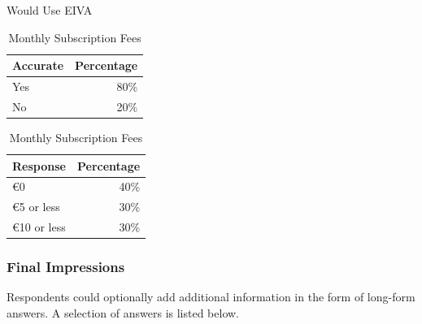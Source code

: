 \documentclass{article}
\begin{document}
\begin{table}[!htb]
	\begin{minipage}{.5\linewidth}
		\caption{Would Use EIVA}
		\centering
		\begin{tabular}{lr}
			\hline
			\textbf{Accurate} & \textbf{Percentage} \\
			\hline
			Yes               & 80\%                \\
			No                & 20\%                \\
			\hline
		\end{tabular}
	\end{minipage}%
	\hspace{.1cm}
	\begin{minipage}{.5\linewidth}
		\centering
		\caption{Monthly Subscription Fees}
		\begin{tabular}{lr}
			\hline
			\textbf{Response} & \textbf{Percentage} \\
			\hline
			€0              & 40\%                \\
			€5 or less      & 30\%                \\
			€10 or less     & 30\%                \\
			\hline
		\end{tabular}
	\end{minipage} 
\end{table}

\subsubsection{Final Impressions}

Respondents could optionally add additional information in the form of long-form answers. A selection of answers is listed below.
\end{document}
